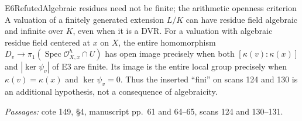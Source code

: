 \begin{result}{E6}{Refuted}{Algebraic residues need not be finite; the arithmetic openness criterion}
A valuation of a finitely generated extension $L/K$ can have residue field algebraic and infinite over $K$, even when it is a DVR. For a valuation with algebraic residue field centered at $x$ on $X$, the entire homomorphism $D_v\to\pi_1(\operatorname{Spec}\mathcal O_{X,x}^h\cap U)$ has open image precisely when both $[\kappa(v):\kappa(x)]$ and $|\ker\psi_v|$ of E3 are finite. Its image is the entire local group precisely when $\kappa(v)=\kappa(x)$ and $\ker\psi_v=0$. Thus the inserted ``fini'' on scans 124 and 130 is an additional hypothesis, not a consequence of algebraicity.
\par\emph{Passages:} cote 149, \S4, manuscript pp.~61 and 64--65, scans 124 and 130--131.
\end{result}
